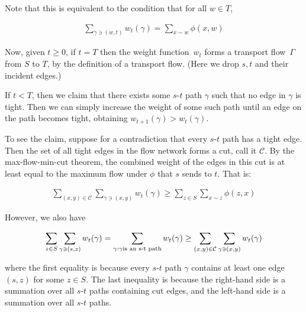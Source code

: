 Note that this is equivalent to the condition that for all $w\in T$,\par


\[\begin{gathered}
\sum_{\gamma\ni(w,t)}w_{t}(\gamma)=\sum_{x\sim w}\phi(x,w)
\end{gathered}\]




Now, given $t\geq 0$, if $t=T$ then the weight function $w_{t}$ forms a transport flow $\Gamma$ from $S$ to $T$, by the definition of a transport flow. (Here we drop $s,t$ and their incident edges.)\par




If $t<T$, then we claim that there exists some $s$-$t$ path $\gamma$ such that no edge in $\gamma$ is tight. Then we can simply increase the weight of some such path until an edge on the path becomes tight, obtaining $w_{t+1}(\gamma)>w_{t}(\gamma)$.\par




To see the claim, suppose for a contradiction that every $s$-$t$ path has a tight edge. Then the set of all tight edges in the flow network forms a cut, call it $\mathcal{C}$. By the max-flow-min-cut theorem, the combined weight of the edges in this cut is at least equal to the maximum flow under $\phi$ that $s$ sends to $t$. That is:\par


\[\begin{gathered}
\sum_{(x,y)\in\mathcal{C}}\sum_{\gamma\ni(x,y)}w_{t}(\gamma)\geq\sum_{z\in S}\sum_{x\sim z}\phi(z,x)
\end{gathered}\]


However, we also have\par


\[\begin{gathered}
\sum_{z\in S}\sum_{\gamma\ni(s,z)}w_{t}(\gamma)=\sum_{\gamma:\gamma\textnormal{is an s-t path}}w_{t}(\gamma)\geq\sum_{(x,y)\in\mathcal{C}}\sum_{\gamma\ni(x,y)}w_{t}(\gamma)
\end{gathered}\]


where the first equality is because every $s$-$t$ path $\gamma$ contains at least one edge $(s,z)$ for some $z\in S$. The last inequality is because the right-hand side is a summation over all $s$-$t$ paths containing cut edges, and the left-hand side is a summation over all $s$-$t$ paths.\par




